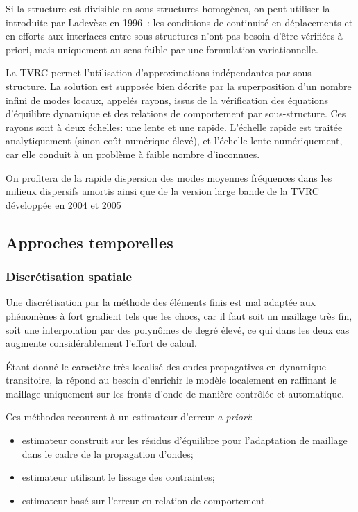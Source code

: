 Si la structure est divisible en sous-structures homogènes, on peut utiliser la  introduite par Ladevèze en 1996~\cite{bib-Lad96}: les conditions de continuité en déplacements et en efforts aux interfaces entre sous-structures n'ont pas besoin d'être vérifiées à priori, mais uniquement au sens faible par une formulation variationnelle.

La TVRC permet l'utilisation d'approximations indépendantes par sous-structure. La solution est supposée bien décrite par la superposition d'un nombre infini de modes locaux, appelés rayons, issus de la vérification des équations d'équilibre dynamique et des relations de comportement par sous-structure. Ces rayons sont à deux échelles: une lente et une rapide. L'échelle rapide est traitée analytiquement (sinon coût numérique élevé), et l'échelle lente numériquement, car elle conduit à un problème à faible nombre d'inconnues.

On profitera de la rapide dispersion des modes moyennes fréquences dans les milieux dispersifs amortis ainsi que de la version large bande de la TVRC développée en 2004 et 2005~\cite{Lit-Chevreuil}

\medskip
\subsection{Approches temporelles}

\subsubsection{Discrétisation spatiale}
Une discrétisation par la méthode des éléments finis est mal adaptée aux phénomènes à fort gradient tels que les chocs, car il faut soit un maillage très fin, soit une interpolation par des polynômes de degré élevé, ce qui dans les deux cas augmente considérablement l'effort de calcul.

Étant donné le caractère très localisé des ondes propagatives en dynamique transitoire, la  répond au besoin d'enrichir le modèle localement en raffinant le maillage uniquement sur les fronts d'onde de manière contrôlée et automatique.

Ces méthodes recourent à un estimateur d'erreur \emph{a priori}:
\begin{itemize}
	\item estimateur construit sur les résidus d'équilibre pour l'adaptation de
		maillage dans le cadre de la propagation d'ondes;
	\item estimateur utilisant le lissage des contraintes;
	\item estimateur basé sur l'erreur en relation de comportement.
\end{itemize}

